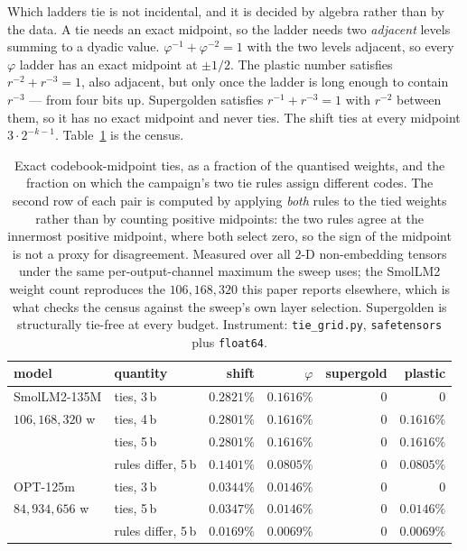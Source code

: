 \documentclass[11pt]{article}
\theoremstyle{definition}
\begin{document}
Which ladders tie is not incidental, and it is decided by algebra rather than by
the data. A tie needs an exact midpoint, so the ladder needs two \emph{adjacent}
levels summing to a dyadic value. $\varphi^{-1}+\varphi^{-2}=1$ with the two
levels adjacent, so every $\varphi$ ladder has an exact midpoint at $\pm1/2$.
The plastic number satisfies $r^{-2}+r^{-3}=1$, also adjacent, but only once the
ladder is long enough to contain $r^{-3}$ --- from four bits up. Supergolden
satisfies $r^{-1}+r^{-3}=1$ with $r^{-2}$ between them, so it has no exact
midpoint and never ties. The shift ties at every midpoint $3\cdot2^{-k-1}$.
Table~\ref{tab:ties} is the census.

\begin{table}[t]\centering
\caption{Exact codebook-midpoint ties, as a fraction of the quantised weights,
and the fraction on which the campaign's two tie rules assign different codes.
The second row of each pair is computed by applying \emph{both} rules to the
tied weights rather than by counting positive midpoints: the two rules agree at
the innermost positive midpoint, where both select zero, so the sign of the
midpoint is not a proxy for disagreement. Measured over all $2$-D non-embedding
tensors under the same per-output-channel maximum the sweep uses; the SmolLM2
weight count reproduces the $106{,}168{,}320$ this paper reports elsewhere,
which is what checks the census against the sweep's own layer selection.
Supergolden is structurally tie-free at every budget. Instrument:
\texttt{tie\_grid.py}, \texttt{safetensors} plus \texttt{float64}.}
\label{tab:ties}
\begin{tabular}{llrrrr}
\toprule
model & quantity & shift & $\varphi$ & supergold & plastic \\
\midrule
SmolLM2-135M & ties, 3\,b        & $0.2821\%$ & $0.1616\%$ & $0$ & $0$ \\
$106{,}168{,}320$ w & ties, 4\,b & $0.2801\%$ & $0.1616\%$ & $0$ & $0.1616\%$ \\
             & ties, 5\,b        & $0.2801\%$ & $0.1616\%$ & $0$ & $0.1616\%$ \\
             & rules differ, 5\,b& $0.1401\%$ & $0.0805\%$ & $0$ & $0.0805\%$ \\
\addlinespace
OPT-125m     & ties, 3\,b        & $0.0344\%$ & $0.0146\%$ & $0$ & $0$ \\
$84{,}934{,}656$ w & ties, 5\,b  & $0.0347\%$ & $0.0146\%$ & $0$ & $0.0146\%$ \\
             & rules differ, 5\,b& $0.0169\%$ & $0.0069\%$ & $0$ & $0.0069\%$ \\
\bottomrule
\end{tabular}
\end{table}
\end{document}
